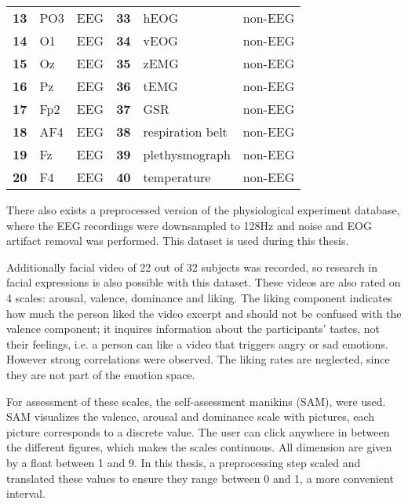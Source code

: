 \begin{table}[]
\begin{tabular}{l|ll|l|ll}
\textbf{13}      & PO3           & EEG               & \textbf{33}      & hEOG             & non-EEG           \\
\textbf{14}      & O1            & EEG               & \textbf{34}      & vEOG             & non-EEG           \\
\textbf{15}      & Oz            & EEG               & \textbf{35}      & zEMG             & non-EEG           \\
\textbf{16}      & Pz            & EEG               & \textbf{36}      & tEMG             & non-EEG           \\
\textbf{17}      & Fp2           & EEG               & \textbf{37}      & GSR              & non-EEG           \\
\textbf{18}      & AF4           & EEG               & \textbf{38}      & respiration belt & non-EEG           \\
\textbf{19}      & Fz            & EEG               & \textbf{39}      & plethysmograph   & non-EEG           \\
\textbf{20}      & F4            & EEG               & \textbf{40}      & temperature      & non-EEG          
\end{tabular}
\end{table}

\npar

There also exists a preprocessed version of the physiological experiment database, where the EEG recordings were downsampled to 128Hz and noise and EOG artifact removal was performed. This dataset is used during this thesis.

\npar

Additionally facial video of 22 out of 32 subjects was recorded, so research in facial expressions is also possible with this dataset. These videos are also rated on 4 scales: arousal, valence, dominance and liking. The liking component indicates how much the person liked the video excerpt and should not be confused with the valence component; it inquires information about the participants' tastes, not their feelings, i.e. a person can like a video that triggers angry or sad emotions. However strong correlations were observed\citep{DEAP}. The liking rates are neglected, since they are not part of the emotion space.
\npar

For assessment of these scales, the self-assessment manikins (SAM), were used\cite{DEAP}. SAM visualizes the valence, arousal and dominance scale with pictures, each picture corresponds to a discrete value. The user can click anywhere in between the different figures, which makes the scales continuous. All dimension are given by a float between 1 and 9. In this thesis, a preprocessing step scaled and translated these values to ensure they range between 0 and 1, a more convenient interval.

